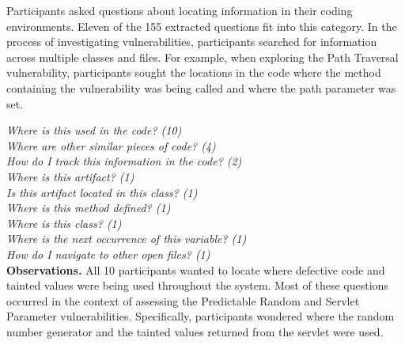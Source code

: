 \documentclass[conference]{IEEEtran}
\begin{document}
Participants asked questions about locating information in their coding environments. 
Eleven of the 155 extracted questions fit into this category.
In the process of investigating vulnerabilities, participants searched for information across multiple classes and files.
For example, when exploring the Path Traversal vulnerability, participants sought the locations in the code where the method containing the vulnerability was being called and where the path parameter was set.

\noindent\emph{Where is this used in the code? (10)} \\
\emph{Where are other similar pieces of code? (4)} \\
\emph{How do I track this information in the code? (2)} \\
\emph{Where is this artifact? (1)} \\
\emph{Is this artifact located in this class? (1)} \\
\emph{Where is this method defined? (1)} \\
\emph{Where is this class? (1)} \\
\emph{Where is the next occurrence of this variable? (1)} \\
\emph{How do I navigate to other open files? (1)} \\


\noindent\textbf{Observations.}
All 10 participants wanted to locate where defective code and tainted values were being used throughout the system. 
Most of these questions occurred in the context of assessing the Predictable Random and Servlet Parameter vulnerabilities.
Specifically, participants wondered where the random number generator and the tainted values returned from the servlet were used.
\end{document}
